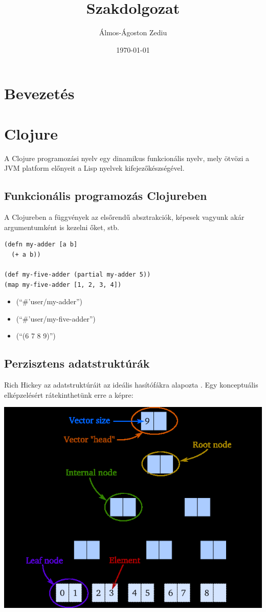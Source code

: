 \documentclass[final, 12pt] {ubb_dolgozat}{book}
\author{Álmos-Ágoston Zediu}
\date{\today}
\title{Szakdolgozat}
\begin{document}
\maketitle
\tableofcontents


\chapter{Bevezetés}
\label{sec:org5136892}
\chapter{Clojure}
\label{sec:org8c47bb4}
A Clojure programozási nyelv egy dinamikus funkcionális nyelv, mely ötvözi a JVM platform előnyeit a Lisp nyelvek
kifejezőkészségével.
\section{Funkcionális programozás Clojureben}
\label{sec:org15d5cf3}

A Clojureben a függvények az elsőrendű absztrakciók, képesek vagyunk akár argumentumként is kezelni őket, stb.

\begin{verbatim}
(defn my-adder [a b]
  (+ a b))

(def my-five-adder (partial my-adder 5))
(map my-five-adder [1, 2, 3, 4])
\end{verbatim}

\begin{itemize}
\item (``\#'user/my-adder'')
\item (``\#'user/my-five-adder'')
\item (``(6 7 8 9)'')
\end{itemize}

\section{Perzisztens adatstruktúrák}
\label{sec:org164b5cb}
Rich Hickey az adatstruktúráit az ideális hasítófákra alapozta \citep{bagwellIdealHashTrees2001}. Egy konceptuális elképzelésért
rátekinthetünk erre a képre:

\begin{center}
\includegraphics[width=.9\linewidth]{images/perzisztens-vektor.jpg}
\end{center}
\end{document}
